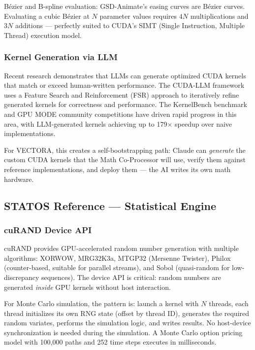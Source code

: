 \documentclass[11pt,letterpaper]{article}
\begin{document}
Bézier and B-spline evaluation: GSD-Animate's easing curves are Bézier curves. Evaluating a cubic Bézier at $N$ parameter values requires $4N$ multiplications and $3N$ additions --- perfectly suited to CUDA's SIMT (Single Instruction, Multiple Thread) execution model.

\subsubsection{Kernel Generation via LLM}

Recent research demonstrates that LLMs can generate optimized CUDA kernels that match or exceed human-written performance. The CUDA-LLM framework uses a Feature Search and Reinforcement (FSR) approach to iteratively refine generated kernels for correctness and performance. The KernelBench benchmark and GPU MODE community competitions have driven rapid progress in this area, with LLM-generated kernels achieving up to 179× speedup over naive implementations.

For VECTORA, this creates a self-bootstrapping path: Claude can \textit{generate} the custom CUDA kernels that the Math Co-Processor will use, verify them against reference implementations, and deploy them --- the AI writes its own math hardware.

\subsection{STATOS Reference --- Statistical Engine}

\subsubsection{cuRAND Device API}

cuRAND provides GPU-accelerated random number generation with multiple algorithms: XORWOW, MRG32K3a, MTGP32 (Mersenne Twister), Philox (counter-based, suitable for parallel streams), and Sobol (quasi-random for low-discrepancy sequences). The device API is critical: random numbers are generated \textit{inside} GPU kernels without host interaction.

For Monte Carlo simulation, the pattern is: launch a kernel with $N$ threads, each thread initializes its own RNG state (offset by thread ID), generates the required random variates, performs the simulation logic, and writes results. No host-device synchronization is needed during the simulation. A Monte Carlo option pricing model with 100,000 paths and 252 time steps executes in milliseconds.
\end{document}
